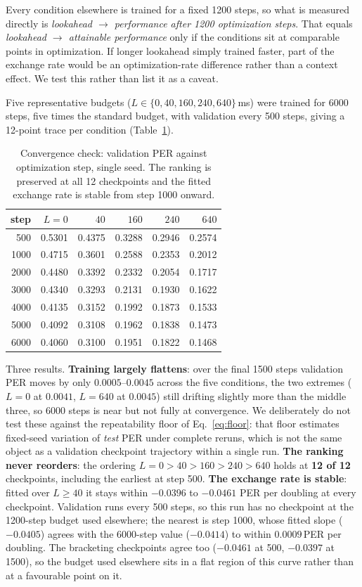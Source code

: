 \documentclass[journal]{IEEEtran}
\begin{document}
Every condition elsewhere is trained for a fixed 1200 steps, so what is
measured directly is \emph{lookahead $\rightarrow$ performance after 1200
optimization steps}. That equals \emph{lookahead $\rightarrow$ attainable
performance} only if the conditions sit at comparable points in optimization.
If longer lookahead simply trained faster, part of the exchange rate would be
an optimization-rate difference rather than a context effect. We test this
rather than list it as a caveat.

Five representative budgets ($L\in\{0,40,160,240,640\}$\,ms) were trained for
6000 steps, five times the standard budget, with validation every 500
steps, giving a 12-point trace per condition (Table~\ref{tab:conv}).

\begin{table}[t]
\centering\small
\caption{Convergence check: validation PER against optimization step, single
seed. The ranking is preserved at all 12 checkpoints and the fitted exchange
rate is stable from step 1000 onward.}
\label{tab:conv}
\begin{tabular}{rrrrrr}
\toprule
step & $L{=}0$ & $40$ & $160$ & $240$ & $640$ \\
\midrule
500  & 0.5301 & 0.4375 & 0.3288 & 0.2946 & 0.2574 \\
1000 & 0.4715 & 0.3601 & 0.2588 & 0.2353 & 0.2012 \\
2000 & 0.4480 & 0.3392 & 0.2332 & 0.2054 & 0.1717 \\
3000 & 0.4340 & 0.3293 & 0.2131 & 0.1930 & 0.1622 \\
4000 & 0.4135 & 0.3152 & 0.1992 & 0.1873 & 0.1533 \\
5000 & 0.4092 & 0.3108 & 0.1962 & 0.1838 & 0.1473 \\
6000 & 0.4060 & 0.3100 & 0.1951 & 0.1822 & 0.1468 \\
\bottomrule
\end{tabular}
\end{table}

Three results. \textbf{Training largely flattens}: over the final 1500 steps
validation PER moves by only $0.0005$--$0.0045$ across the five conditions, the
two extremes ($L{=}0$ at $0.0041$, $L{=}640$ at $0.0045$) still drifting
slightly more than the middle three, so 6000 steps is near but not fully at
convergence. We deliberately do not test these against the repeatability floor
of Eq.~\ref{eq:floor}: that floor estimates fixed-seed variation of \emph{test}
PER under complete reruns, which is not the same object as a validation
checkpoint trajectory within a single run. \textbf{The ranking never reorders}: the ordering
$L{=}0 > 40 > 160 > 240 > 640$ holds at \textbf{12 of 12} checkpoints,
including the earliest at step 500. \textbf{The exchange rate is stable}:
fitted over $L\geq40$ it stays within $-0.0396$ to $-0.0461$ PER per doubling
at every checkpoint. Validation runs every 500 steps, so this run has no
checkpoint at the 1200-step budget used elsewhere; the nearest is step 1000,
whose fitted slope ($-0.0405$) agrees with the 6000-step value ($-0.0414$) to
within $0.0009$\,PER per doubling. The bracketing checkpoints agree
too ($-0.0461$ at 500, $-0.0397$ at 1500), so the budget used elsewhere sits in
a flat region of this curve rather than at a favourable point on it.
\end{document}
